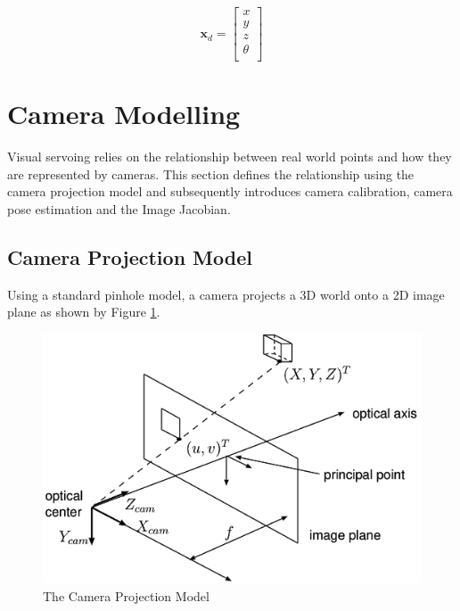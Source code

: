 \documentclass{UoNMCHA}
\numberwithin{equation}{section}
\begin{document}
\begin{equation}
\mathrm{\mathbf{x}}_d = 
\begin{bmatrix}
x \\ y \\ z \\ \theta \\
\end{bmatrix}
\end{equation} 



\newpage
\section{Camera Modelling}

Visual servoing relies on the relationship between real world points and how they are represented by cameras. This section defines the relationship using the camera projection model and subsequently introduces camera calibration, camera pose estimation and the Image Jacobian.

\subsection{Camera Projection Model}\label{Camera Projection Model}

Using a standard pinhole model, a camera projects a 3D world onto a 2D image plane as shown by Figure \ref{fig:CameraProjectionModel}.
 
\begin{figure}[H]
	\begin{center}
		\includegraphics[width=.8\linewidth]{Figures/CameraProjectionModel}
		\caption{The Camera Projection Model}
		\label{fig:CameraProjectionModel}
	\end{center}
\end{figure}
\end{document}
